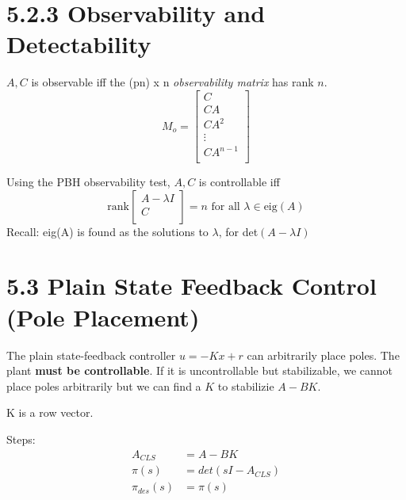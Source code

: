 \section*{5.2.3 Observability and Detectability}
\( A, C \) is observable iff the (pn) x n \textit{observability matrix} has rank \( n \).
\begin{equation*}
    M_o = \begin{bmatrix}
        C        \\
        CA       \\
        CA^2     \\
        \vdots   \\
        CA^{n-1} \\
    \end{bmatrix}
\end{equation*}

Using the PBH observability test, \( A, C \) is controllable iff
\begin{equation*}
    \text{rank}\begin{bmatrix}
        A - \lambda I \\
        C             \\
    \end{bmatrix} = n \text{ for all } \lambda \in \text{eig}(A)
\end{equation*}
Recall: eig(A) is found as the solutions to \( \lambda \), for det\( ( A - \lambda I ) \)

\section*{5.3 Plain State Feedback Control (Pole Placement)}
The plain state-feedback controller \( u = -Kx + r \) can arbitrarily place poles.
The plant \textbf{must be controllable}.
If it is uncontrollable but stabilizable, we cannot place poles arbitrarily but we can find a \( K \) to stabilizie \( A - BK \).

K is a row vector.

Steps:
\begin{equation*}
    \begin{aligned}
        A_{CLS}      & = A - BK          \\
        \pi(s)       & = det(sI-A_{CLS}) \\
        \pi_{des}(s) & = \pi(s)          \\
    \end{aligned}
\end{equation*}

